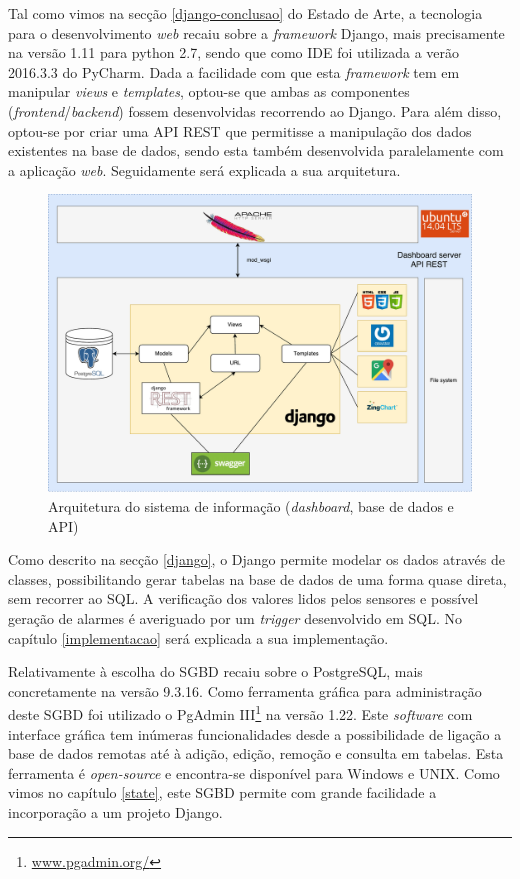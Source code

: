 Tal como vimos na secção \ref{django-conclusao} do Estado de Arte, a tecnologia para o desenvolvimento \textit{web} recaiu sobre a \textit{framework} Django, mais precisamente na versão 1.11 para python 2.7, sendo que como \ac{IDE} foi utilizada a verão 2016.3.3 do PyCharm. Dada a facilidade com que esta \textit{framework} tem em manipular \textit{views} e \textit{templates}, optou-se que ambas as componentes (\textit{frontend}/\textit{backend}) fossem desenvolvidas recorrendo ao Django. Para além disso, optou-se por criar uma API REST que permitisse a manipulação dos dados existentes na base de dados, sendo esta também desenvolvida paralelamente com a aplicação \textit{web}. Seguidamente será explicada a sua arquitetura.   



\begin{figure}[h]
	\centering
	\includegraphics[width=\linewidth]{esquemas/fisica-si.pdf}
	\caption{Arquitetura do sistema de informação (\textit{dashboard}, base de dados e API)}
	\label{arquiteturasi}
\end{figure}




Como descrito na secção \ref{django}, o Django permite modelar os dados através de classes, possibilitando gerar tabelas na base de dados de uma forma quase direta, sem recorrer ao \ac{SQL}. A verificação dos valores lidos pelos sensores e possível geração de alarmes é averiguado por um \textit{trigger} desenvolvido em \ac{SQL}. No capítulo \ref{implementacao} será explicada a sua implementação.  


Relativamente à escolha do \ac{SGBD} recaiu sobre o PostgreSQL, mais concretamente na versão 9.3.16. Como ferramenta gráfica para administração deste \ac{SGBD} foi utilizado o PgAdmin III\footnote{\url{www.pgadmin.org/}} na versão 1.22. Este \textit{software} com interface gráfica tem inúmeras funcionalidades desde a possibilidade de ligação a base de dados remotas até à adição, edição, remoção e consulta em tabelas. Esta ferramenta é \textit{open-source} e encontra-se disponível para Windows e UNIX. Como vimos no capítulo \ref{state}, este \ac{SGBD} permite com grande facilidade a incorporação a um projeto Django. 


